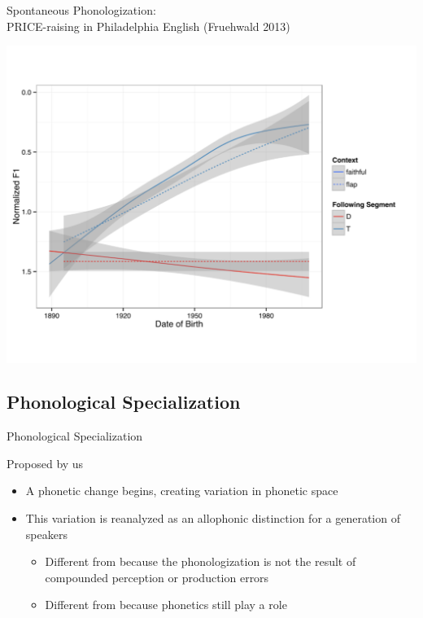 \documentclass[hyperref={pdfpagelabels=false}]{beamer}
\begin{document}
\begin{frame}{Spontaneous Phonologization: \\ \small{PRICE-raising in Philadelphia English (Fruehwald 2013)}}

	
\begin{center}
\includegraphics[trim=2cm 2cm 2cm 2cm, clip=false, width=.8\textwidth]{ayraisingphila.pdf}
\end{center}

\end{frame}

\subsection{Phonological Specialization}

\begin{frame}{Phonological Specialization}

	Proposed by us \pause
	\begin{itemize}
		\item A phonetic change begins, creating variation in phonetic space \pause
		\item This variation is reanalyzed as an allophonic distinction for a generation of speakers \pause
		\begin{itemize}
				\item Different from \citet{Ohala1981} because the phonologization is not the result of compounded perception or production errors \pause
				\item Different from \citet{fruehwald2013, JandaJoseph2003} because phonetics still play a role 
		\end{itemize}
	\end{itemize}

\end{frame}
\end{document}

